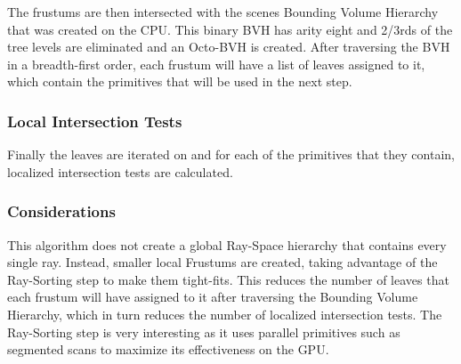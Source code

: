 \documentclass{llncs}
\begin{document}
The frustums are then intersected with the scenes Bounding Volume Hierarchy that was created on the CPU. This binary BVH has arity eight and 2/3rds of the tree levels are eliminated and an Octo-BVH is created. After traversing the BVH in a breadth-first order, each frustum will have a list of leaves assigned to it, which contain the primitives that will be used in the next step.

\subsubsection{Local Intersection Tests}

Finally the leaves are iterated on and for each of the primitives that they contain, localized intersection tests are calculated.

\subsubsection{Considerations}

This algorithm does not create a global Ray-Space hierarchy that contains every single ray. Instead, smaller local Frustums are created, taking advantage of the Ray-Sorting step to make them tight-fits. This reduces the number of leaves that each frustum will have assigned to it after traversing the Bounding Volume Hierarchy, which in turn reduces the number of localized intersection tests. The Ray-Sorting step is very interesting as it uses parallel primitives such as segmented scans to maximize its effectiveness on the GPU.

%
%



\end{document}
